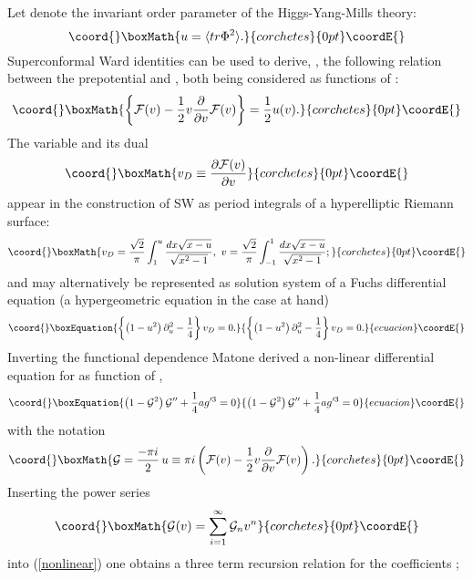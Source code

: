 \documentclass[a4paper,12pt]{article}
\begin{document}
Let \coordHE{} denote the \coordHE{} invariant order parameter of the 
\coordHE{} Higgs-Yang-Mills theory:
\[\coord{}\boxMath{
u=\langle tr \Phi^2\rangle.
}{corchetes}{0pt}\coordE{}\]
Superconformal Ward identities can be used to derive, \cite{howe}, 
the following 
relation between the prepotential and \coordHE{}, both being considered as 
functions of \coordHE{}:
\[\coord{}\boxMath{
\left\{{\cal F}(v)-\frac{1}{2}v\frac{\partial}{\partial v}{\cal F}(v)
\right\}=\frac{1}{2}u(v).
}{corchetes}{0pt}\coordE{}\]
The variable \coordHE{} and its dual 
\[\coord{}\boxMath{
v_D\equiv \frac{\partial {\cal F}(v)}{\partial v}
}{corchetes}{0pt}\coordE{}\]
appear in the construction of SW as period integrals of a 
hyperelliptic Riemann surface:
\[\coord{}\boxMath{
v_D=\frac{\sqrt{2}}{\pi}\int_1^u \frac{dx\sqrt{x-u}}{\sqrt{x^2-1}},
\,\, v=\frac{\sqrt{2}}{\pi}\int_{-1}^1 \frac{dx\sqrt{x-u}}{\sqrt{x^2-1}};
}{corchetes}{0pt}\coordE{}\]
\coordHE{} and \coordHE{} may alternatively be represented as solution system of a 
Fuchs differential equation (a hypergeometric equation in the case at 
hand)
\begin{equation}\coord{}\boxEquation{
\left\{
\left(1-u^2\right)\partial_u^2-\frac{1}{4}
\right\}v_D=0.
\label{fuchs}
}{
\left\{
\left(1-u^2\right)\partial_u^2-\frac{1}{4}
\right\}v_D=0.
}{ecuacion}\coordE{}\end{equation}
Inverting the functional dependence Matone \cite{matone3} derived  
a non-linear differential equation for \coordHE{} as function of \coordHE{},
\begin{equation}\coord{}\boxEquation{
\left(1-{\cal G}^2\right){\cal G}''+\frac{1}{4}ag'^3=0
\label{nonlinear}
}{
\left(1-{\cal G}^2\right){\cal G}''+\frac{1}{4}ag'^3=0
}{ecuacion}\coordE{}\end{equation}
with the notation \[\coord{}\boxMath{
{\cal G}=\frac{-\pi i }{2} \, u\equiv \pi i \left({\cal F}(v)-\frac{1}{2}v 
\frac{\partial}{\partial v} {\cal F}(v)
\right).
}{corchetes}{0pt}\coordE{}\]
Inserting the power series 
\[\coord{}\boxMath{
{\cal G}(v)=\sum_{i=1}^{\infty} {\cal G}_n v^n
}{corchetes}{0pt}\coordE{}\]
into (\ref{nonlinear}) one obtains a three term recursion relation 
for the coefficients \coordHE{};
\end{document}
